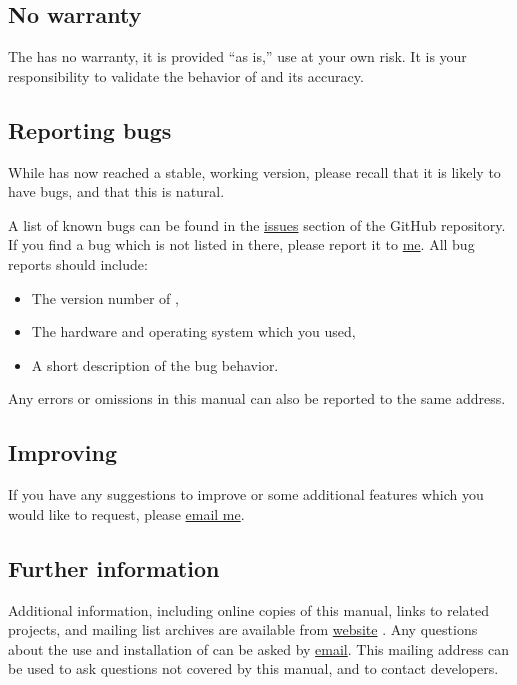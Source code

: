 \documentclass{ol-softwaremanual}
\begin{document}
\subsection{No warranty}

The \thel has no warranty, it is provided ``as is,'' use at your own risk. It is your responsibility to validate the behavior of \thel and its accuracy. 

\subsection{Reporting bugs}

While \thel has now reached a stable, working version, please recall that it is likely to have bugs, and that this is natural. 

A list of known bugs can be found in the \href{\issuesurl}{issues} section of the GitHub repository.
If you find a bug which is not listed in there, please report it to \href{mailto:michele.castellana@gmail.com}{me}. All bug reports should include:
\begin{itemize}
    \item The version number of \thel, 
    \item The hardware and operating system which you used, 
    \item A short description of the bug behavior. 

\end{itemize}

Any errors or omissions in this manual can also be reported to the same address.

\subsection{Improving \thel}

If you have any suggestions to improve \thel or some additional features which you would like to request, please \href{\contactemail}{email me}. 

\subsection{Further information}


Additional information, including online copies of this manual, links to related projects, and mailing list archives are available from \thel \href{\thelemacusurl}{website}  .
Any questions about the use and installation of \thel can be asked by \href{\contactemail}{email}. This mailing address can be used to ask questions not covered by this manual, and to contact \thel developers.
\end{document}
